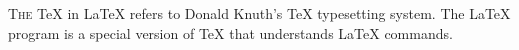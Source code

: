 \lettrine{T}{he} \TeX{} in \LaTeX{} refers
to Donald Knuth's \TeX{} typesetting system.
The \LaTeX{} program is a special version of
\TeX{} that understands \LaTeX{} commands.
